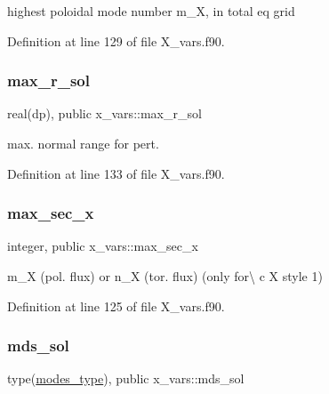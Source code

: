highest poloidal mode number {\ttfamily m\+\_\+X}, in total eq grid 



Definition at line 129 of file X\+\_\+vars.\+f90.

\mbox{\label{namespacex__vars_a0f45dfddb928623424eeb8b8bdd2b0f9}} 
\subsubsection{\texorpdfstring{max\+\_\+r\+\_\+sol}{max\_r\_sol}}
{\footnotesize\ttfamily real(dp), public x\+\_\+vars\+::max\+\_\+r\+\_\+sol}



max. normal range for pert. 



Definition at line 133 of file X\+\_\+vars.\+f90.

\mbox{\label{namespacex__vars_ae19ca528c5688228ff20912a45290b2a}} 
\subsubsection{\texorpdfstring{max\+\_\+sec\+\_\+x}{max\_sec\_x}}
{\footnotesize\ttfamily integer, public x\+\_\+vars\+::max\+\_\+sec\+\_\+x}



{\ttfamily m\+\_\+X} (pol. flux) or {\ttfamily n\+\_\+X} (tor. flux) (only for\textbackslash{} c X style 1) 



Definition at line 125 of file X\+\_\+vars.\+f90.

\mbox{\label{namespacex__vars_ac74f59668de6caca7038decc7191c6a1}} 
\subsubsection{\texorpdfstring{mds\+\_\+sol}{mds\_sol}}
{\footnotesize\ttfamily type(\hyperlink{structx__vars_1_1modes__type}{modes\+\_\+type}), public x\+\_\+vars\+::mds\+\_\+sol}



